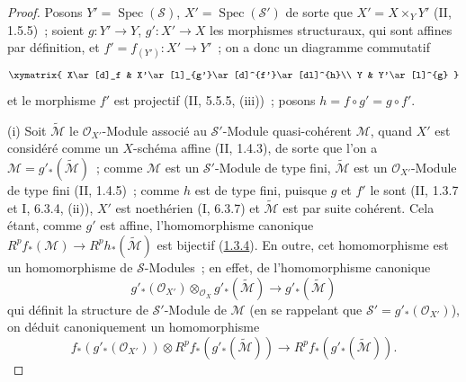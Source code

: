 \begin{proof}
Posons $Y'=\operatorname{Spec}(\mathcal S)$,
$X'=\operatorname{Spec}(\mathcal S')$ de sorte que
$X'=X\times_Y Y'$ (II, 1.5.5)~; soient $g:Y'\to Y$,
$g':X'\to X$ les morphismes structuraux, qui sont affines par
définition, et $f'=f_{(Y')}:X'\to Y'$~; on a donc un diagramme
commutatif
\[
\xymatrix{
X\ar[d]_f & X'\ar[l]_{g'}\ar[d]^{f'}\ar[dl]^{h}\\
Y & Y'\ar[l]^{g}
}
\]
et le morphisme $f'$ est projectif (II, 5.5.5, (iii))~; posons
$h=f\circ g'=g\circ f'$.

(i) Soit $\widetilde{\mathcal M}$ le $\mathcal O_{X'}$-Module associé au
$\mathcal S'$-Module quasi-cohérent $\mathcal M$, quand $X'$ est
considéré comme un $X$-schéma affine (II, 1.4.3), de sorte que l'on a
$\mathcal M=g'_*(\widetilde{\mathcal M})$~; comme $\mathcal M$ est un
$\mathcal S'$-Module de type fini, $\widetilde{\mathcal M}$ est un
$\mathcal O_{X'}$-Module de type fini (II, 1.4.5)~; comme $h$ est de type
fini, puisque $g$ et $f'$ le sont (II, 1.3.7 et I, 6.3.4, (ii)), $X'$ est
noethérien (I, 6.3.7) et $\widetilde{\mathcal M}$ est par suite cohérent.
Cela étant, comme $g'$ est affine, l'homomorphisme canonique
$R^pf_*(\mathcal M)\to R^ph_*(\widetilde{\mathcal M})$ est bijectif
(\hyperref[III.1.3.4-fr]{1.3.4}). En outre, cet homomorphisme est un
homomorphisme de $\mathcal S$-Modules~; en effet, de l'homomorphisme
canonique
\[
g'_*(\mathcal O_{X'})\otimes_{\mathcal O_X}
g'_*(\widetilde{\mathcal M})\longrightarrow
g'_*(\widetilde{\mathcal M})
\tag{2.4.1.2}\label{III.2.4.1.2-fr}
\]
qui définit la structure de $\mathcal S'$-Module de $\mathcal M$ (en se
rappelant que $\mathcal S'=g'_*(\mathcal O_{X'})$), on déduit
canoniquement un homomorphisme
\[
f_*(g'_*(\mathcal O_{X'}))\otimes
R^pf_*(g'_*(\widetilde{\mathcal M}))\longrightarrow
R^pf_*(g'_*(\widetilde{\mathcal M})).
\]


\end{proof}
